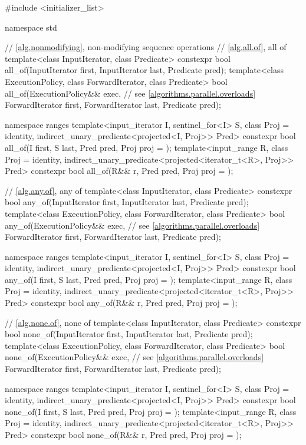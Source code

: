 \begin{codeblock}
#include <initializer_list>

namespace std {
  // \ref{alg.nonmodifying}, non-modifying sequence operations
  // \ref{alg.all.of}, all of
  template<class InputIterator, class Predicate>
    constexpr bool all_of(InputIterator first, InputIterator last, Predicate pred);
  template<class ExecutionPolicy, class ForwardIterator, class Predicate>
    bool all_of(ExecutionPolicy&& exec,                         // see \ref{algorithms.parallel.overloads}
                ForwardIterator first, ForwardIterator last, Predicate pred);

  namespace ranges {
    template<input_iterator I, sentinel_for<I> S, class Proj = identity,
             indirect_unary_predicate<projected<I, Proj>> Pred>
      constexpr bool all_of(I first, S last, Pred pred, Proj proj = {});
    template<input_range R, class Proj = identity,
             indirect_unary_predicate<projected<iterator_t<R>, Proj>> Pred>
      constexpr bool all_of(R&& r, Pred pred, Proj proj = {});
  }

  // \ref{alg.any.of}, any of
  template<class InputIterator, class Predicate>
    constexpr bool any_of(InputIterator first, InputIterator last, Predicate pred);
  template<class ExecutionPolicy, class ForwardIterator, class Predicate>
    bool any_of(ExecutionPolicy&& exec,                         // see \ref{algorithms.parallel.overloads}
                ForwardIterator first, ForwardIterator last, Predicate pred);

  namespace ranges {
    template<input_iterator I, sentinel_for<I> S, class Proj = identity,
             indirect_unary_predicate<projected<I, Proj>> Pred>
      constexpr bool any_of(I first, S last, Pred pred, Proj proj = {});
    template<input_range R, class Proj = identity,
             indirect_unary_predicate<projected<iterator_t<R>, Proj>> Pred>
      constexpr bool any_of(R&& r, Pred pred, Proj proj = {});
  }

  // \ref{alg.none.of}, none of
  template<class InputIterator, class Predicate>
    constexpr bool none_of(InputIterator first, InputIterator last, Predicate pred);
  template<class ExecutionPolicy, class ForwardIterator, class Predicate>
    bool none_of(ExecutionPolicy&& exec,                        // see \ref{algorithms.parallel.overloads}
                 ForwardIterator first, ForwardIterator last, Predicate pred);

  namespace ranges {
    template<input_iterator I, sentinel_for<I> S, class Proj = identity,
             indirect_unary_predicate<projected<I, Proj>> Pred>
      constexpr bool none_of(I first, S last, Pred pred, Proj proj = {});
    template<input_range R, class Proj = identity,
             indirect_unary_predicate<projected<iterator_t<R>, Proj>> Pred>
      constexpr bool none_of(R&& r, Pred pred, Proj proj = {});
  }

}
\end{codeblock}
